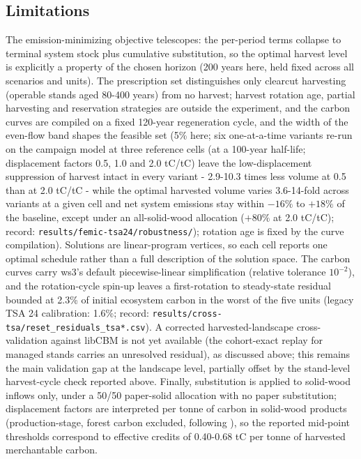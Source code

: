 \documentclass[preprint,12pt,authoryear]{elsarticle}
\begin{document}
\begin{linenumbers}
\subsection{Limitations}
The emission-minimizing objective telescopes: the per-period terms collapse to terminal system stock plus cumulative substitution, so the optimal harvest level is explicitly a property of the chosen horizon (200 years here, held fixed across all scenarios and units). The prescription set distinguishes only clearcut harvesting (operable stands aged 80-400 years) from no harvest; harvest rotation age, partial harvesting and reservation strategies are outside the experiment, and the carbon curves are compiled on a fixed 120-year regeneration cycle, and the width of the even-flow band shapes the feasible set (5\% here; six one-at-a-time variants re-run on the campaign model at three reference cells (at a 100-year half-life; displacement factors 0.5, 1.0 and 2.0 tC/tC) leave the low-displacement suppression of harvest intact in every variant - 2.9-10.3 times less volume at 0.5 than at 2.0 tC/tC - while the optimal harvested volume varies 3.6-14-fold across variants at a given cell and net system emissions stay within $-16\%$ to $+18\%$ of the baseline, except under an all-solid-wood allocation ($+80\%$ at 2.0 tC/tC); record: \texttt{results/femic-tsa24/robustness/}); rotation age is fixed by the curve compilation). Solutions are linear-program vertices, so each cell reports one optimal schedule rather than a full description of the solution space. The carbon curves carry \ac{ws3}'s default piecewise-linear simplification (relative tolerance $10^{-2}$), and the rotation-cycle spin-up leaves a first-rotation to steady-state residual bounded at 2.3\% of initial ecosystem carbon in the worst of the five units (legacy TSA 24 calibration: 1.6\%; record: \texttt{results/cross-tsa/reset\_residuals\_tsa*.csv}). A corrected harvested-landscape cross-validation against libCBM is not yet available (the cohort-exact replay for managed stands carries an unresolved residual), as discussed above; this remains the main validation gap at the landscape level, partially offset by the stand-level harvest-cycle check reported above. Finally, substitution is applied to solid-wood inflows only, under a 50/50 paper-solid allocation with no paper substitution; displacement factors are interpreted per tonne of carbon in solid-wood products (production-stage, forest carbon excluded, following \citealp{leskinen2018}), so the reported mid-point thresholds correspond to effective credits of 0.40-0.68 tC per tonne of harvested merchantable carbon.


\end{linenumbers}
\end{document}
